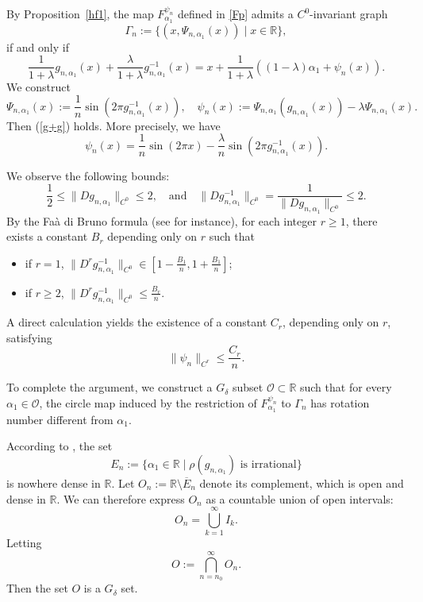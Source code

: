 \documentclass{amsart}
\newcommand{\R}{\mathbb{R}}
\newcommand{\al}{\alpha}
\theoremstyle{definition}
\begin{document}
By Proposition~\ref{hf1}, the map $F_{\alpha_1}^{\psi_n}$ defined in \eqref{Fp} admits a $C^0$-invariant graph
\[
\Gamma_n := \{(x, \Psi_{n,\alpha_1}(x)) \mid x \in \R\},
\]
if and only if
\begin{equation}\label{g+g}
\frac{1}{1+\lambda}g_{n,\alpha_1}(x) + \frac{\lambda}{1+\lambda}g_{n,\alpha_1}^{-1}(x) = x + \frac{1}{1+\lambda}\left((1-\lambda)\alpha_1  + \psi_n(x)\right).
\end{equation}
We construct
\[\Psi_{n,\alpha_1}(x):=\frac{1}{n} \sin(2\pi g_{n,\al_1}^{-1}(x)),\quad \psi_n(x):=\Psi_{n,\alpha_1}(g_{n,\al_1}(x))-\lambda\Psi_{n,\alpha_1}(x).\]
Then (\ref{g+g}) holds. More precisely, we have
\[
\psi_n(x) = \frac{1}{n} \sin(2\pi x) - \frac{\lambda}{n} \sin(2\pi g_{n,\alpha_1}^{-1}(x)).
\]

We observe the following bounds:
\[
\frac{1}{2} \leq \|Dg_{n,\alpha_1}\|_{C^0} \leq 2, \quad \text{and} \quad \|Dg_{n,\alpha_1}^{-1}\|_{C^0} = \frac{1}{\|Dg_{n,\alpha_1}\|_{C^0}} \leq 2.
\]
By the  Fa\`{a} di Bruno formula (see \cite[Corollary 2.4]{H11} for instance), for each integer $r \geq 1$, there exists a constant $B_r$ depending only on $r$ such that
\begin{itemize}
\item if $r=1$, $\|D^{r} g_{n,\alpha_1}^{-1}\|_{C^0}\in [1-\frac{B_1}{n}, 1+\frac{B_1}{n}]$;
\item if $r\geq 2$, $\|D^{r} g_{n,\alpha_1}^{-1}\|_{C^0}\leq \frac{B_r}{n}$.
\end{itemize}

A direct calculation yields the existence of a constant $C_r$, depending only on $r$, satisfying
\[
\|\psi_n\|_{C^r} \leq \frac{C_r}{n}.
\]

To complete the argument, we construct a $G_\delta$ subset $\mathcal{O} \subset \R$ such that for every $\alpha_1 \in \mathcal{O}$, the circle map induced by the restriction of $F^{\psi_n}_{\alpha_1}$ to $\Gamma_n$ has rotation number different from $\alpha_1$.

According to \cite[Lemma 4.2]{de}, the set
\[
E_n := \{\alpha_1 \in \R \mid \rho(g_{n,\alpha_1}) \text{ is irrational}\}
\]
is nowhere dense in $\R$. Let $O_n := \R \setminus \overline{E}_n$ denote its complement, which is open and dense in $\R$. We can therefore express $O_n$ as a countable union of open intervals:
\[
O_n = \bigcup_{k=1}^{\infty} I_k.
\]
Letting
\[
{O}:= \bigcap_{n=n_0}^{\infty} {O}_n.
\]
Then the set $O$ is a $G_\delta$ set.
\end{document}
